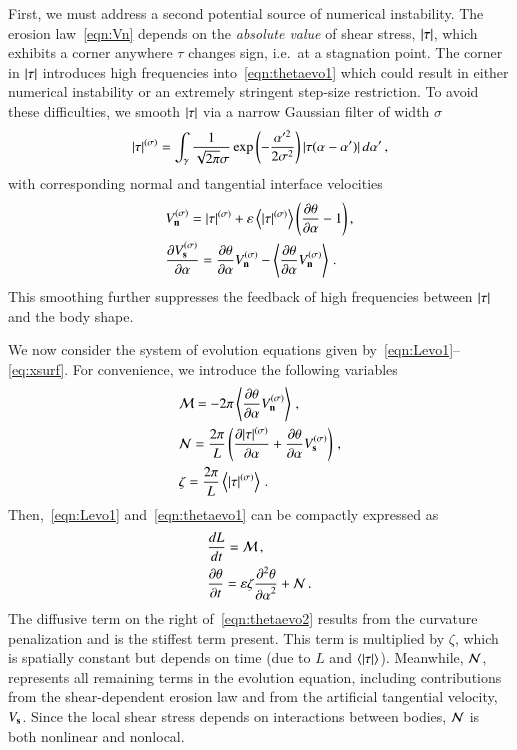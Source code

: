 \documentclass[preprint, 10pt]{elsarticle}
\begin{document}
First, we must address a second potential source of numerical
instability. The erosion law~\eqref{eqn:Vn} depends on the {\em absolute
value} of shear stress, $\lvert \tau \rvert$, which exhibits a corner anywhere $\tau$
changes sign, i.e.~at a stagnation point. The corner in $\lvert \tau \rvert$
introduces high frequencies into~\eqref{eqn:thetaevo1} which could result in either numerical instability or an extremely stringent step-size restriction. To avoid these difficulties, we smooth $\lvert \tau \rvert$ via a narrow Gaussian filter of width $\sigma$
\begin{align}
\lvert \tau \rvert^{(\sigma)} = \int_{\gamma} \frac{1}{\sqrt{2\pi} \sigma}
 \exp \left(- \frac{\alpha'^2}{2 \sigma^2}\right) \lvert  \tau(\alpha - \alpha')  \rvert \, d\alpha' \, ,
\end{align}
with corresponding normal and tangential interface velocities
\begin{align}
& V_{\mathbf{n}}^{(\sigma)} = \lvert \tau \rvert^{(\sigma)} +  \varepsilon \left< \lvert \tau \rvert^{(\sigma)} \right>
\left(\frac{\partial \theta}{\partial \alpha} - 1 \right), \\
& \frac{\partial V_{\mathbf{s}}^{(\sigma)}}{\partial \alpha} = \frac{\partial \theta}{\partial \alpha} V_{\mathbf{n}}^{(\sigma)} - \left< \frac{\partial \theta}{\partial \alpha} V_{\mathbf{n}}^{(\sigma)} \right> \, .
\end{align}
This smoothing further suppresses the feedback of high frequencies between $\lvert \tau \rvert$ and the body shape.

We now consider the system of evolution equations given by~\eqref{eqn:Levo1}--\eqref{eq:xsurf}. For convenience, we introduce the following variables
\begin{align}
& \mathcal{M} = - 2 \pi \left< \frac{\partial \theta}{\partial \alpha} V_{\mathbf{n}}^{(\sigma)} \right> \, , \\
& \mathcal{N} = \frac{2 \pi}{L} \left( \frac{\partial \lvert \tau \rvert^{(\sigma)}}{\partial \alpha} + \frac{\partial \theta}{\partial \alpha}
V_{\mathbf{s}}^{(\sigma)} \right) \, , \\
& \zeta = \frac{2 \pi}{L}  \left< \lvert \tau \rvert^{(\sigma)} \right> \, .
\end{align}
Then,~\eqref{eqn:Levo1} and~\eqref{eqn:thetaevo1} can be compactly expressed as
\begin{align}
\label{eqn:Levo2}
& \frac{d L}{d t} = \mathcal{M} \, , \\
\label{eqn:thetaevo2}
& \frac{\partial \theta}{\partial t} = \varepsilon \zeta \frac{\partial^2 \theta}{{\partial \alpha}^2} + \mathcal{N} \,.
\end{align}
The diffusive term on the right of~\eqref{eqn:thetaevo2} results from the curvature penalization and is the stiffest term present. This term is multiplied by $\zeta$, which is spatially constant but depends on time (due to $L$ and $\left< \lvert \tau \rvert \right>$). Meanwhile, $\mathcal{N}$, represents all remaining terms in the evolution equation, including contributions from the shear-dependent erosion law and from the artificial tangential velocity, $V_{\mathbf{s}}$. Since the local shear stress depends on interactions between bodies, $\mathcal{N}$ is both nonlinear and nonlocal.
\end{document}
